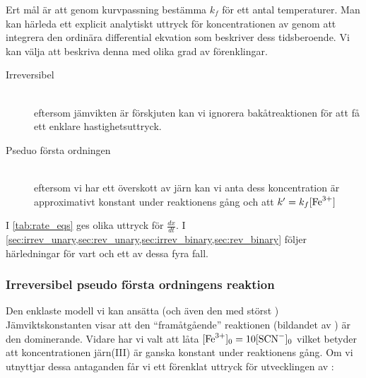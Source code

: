Ert mål är att genom kurvpassning bestämma $k_f$ för ett antal temperaturer.
Man kan härleda ett explicit analytiskt uttryck för koncentrationen
av  genom att integrera den ordinära differential ekvation
som beskriver dess tidsberoende. Vi kan välja att beskriva denna med
olika grad av förenklingar.
\begin{description}
\item[Irreversibel] \hfill \\
  eftersom jämvikten är förskjuten kan vi ignorera
  bakåtreaktionen för att få ett enklare hastighetsuttryck.
\item[Pseduo första ordningen] \hfill \\
  eftersom vi har ett överskott av järn kan vi anta dess koncentration är
  approximativt konstant under reaktionens gång och att $k' = k_f[\ce{Fe^3+}]$
\end{description}



I \cref{tab:rate_eqs} ges olika uttryck för $\frac{dx}{dt}$. I
\cref{sec:irrev_unary,sec:rev_unary,sec:irrev_binary,sec:rev_binary} 
följer härledningar för vart och ett av dessa fyra fall. 






\subsubsection{Irreversibel pseudo första ordningens reaktion}
\label{sec:irrev_unary}
Den enklaste modell vi kan ansätta (och även den med störst )
Jämviktskonstanten visar att den ``framåtgående'' reaktionen (bildandet av )
är den dominerande. Vidare har vi valt att låta $[\ce{Fe^3+}]_0=10[\ce{SCN-}]_0$ vilket
betyder att koncentrationen järn(III) är ganska konstant under reaktionens gång. Om vi
utnyttjar dessa antaganden får vi ett förenklat uttryck för utvecklingen
av :

